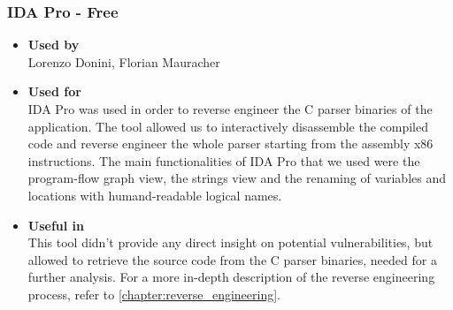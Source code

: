 \subsubsection*{IDA Pro - Free}
\begin{itemize}
	\item \textbf{Used by}\\ Lorenzo Donini, Florian Mauracher
	\item \textbf{Used for}\\ IDA Pro was used in order to reverse engineer the C parser binaries of the \bs{} application. The tool allowed us to interactively disassemble the compiled code and reverse engineer the whole parser starting from the assembly x86 instructions.\newline
	The main functionalities of IDA Pro that we used were the program-flow graph view, the strings view and the renaming of variables and locations with humand-readable logical names.
	\item \textbf{Useful in}\\ This tool didn't provide any direct insight on potential vulnerabilities, but allowed to retrieve the source code from the C parser binaries, needed for a further analysis. For a more in-depth description of the reverse engineering process, refer to \ref{chapter:reverse_engineering}.
\end{itemize}

